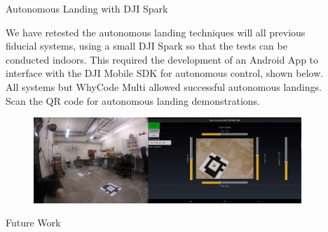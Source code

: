 \documentclass[final, 20pt]{beamer}
\newlength{\sepwidth}
\newlength{\colwidth}
\newcommand{\separatorcolumn}{\begin{column}{\sepwidth}\end{column}}
\begin{document}
\begin{frame}[t]
\begin{columns}[t]
\begin{column}{\colwidth}
\end{column}

\separatorcolumn

\begin{column}{\colwidth}

  \begin{alertblock}{Autonomous Landing with DJI Spark}

    We have retested the autonomous landing techniques will all previous fiducial systems, using a small DJI Spark
      so that the tests can be conducted indoors.
      This required the development of an Android App to interface with the DJI Mobile SDK for autonomous control, shown below.
      All systems but WhyCode Multi allowed successful autonomous landings.
      Scan the QR code for autonomous landing demonstrations.
      \begin{figure}
          \centering
          \includegraphics[width=\linewidth]{images/demo_screenshot}
      \end{figure}

  \end{alertblock}

  \begin{block}{Future Work}


\end{block}
\end{column}
\end{columns}
\end{frame}
\end{document}
